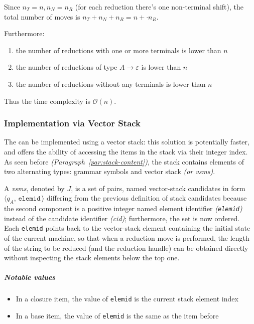 \documentclass[english]{article}
\begin{document}
Since \(n_T = n, n_N=n_R\) (for each reduction there's one non-terminal shift), the total number of moves is \(n_T + n_N + n_R = n +  \cdot n_R\).

Furthermore:
\begin{enumerate}
  \item the number of reductions with one or more terminals is lower than \(n\)
  \item the number of reductions of type \(A \rightarrow \varepsilon\) is lower than \(n\)
  \item the number of reductions without any terminals is lower than \(n\)
\end{enumerate}

Thus the time complexity is \(\mathcal{O}(n)\).

\subsubsection{Implementation via Vector Stack}

The \PDA can be implemented using a vector stack: this solution is potentially faster, and offers the ability of accessing the items in the stack via their integer index.
As seen before \textit{(Paragraph~\ref{par:stack-content})}, the stack contains elements of two alternating types: grammar symbols and vector stack \mstates \textit{(or vsms)}.

A \textit{vsms}, denoted by \(J\), is a set of pairs, named vector-stack candidates in form \(\langle q_A, \, \texttt{elemid} \, \rangle\) differing from the previous definition of stack candidates because the second component is a positive integer named element identifier \textit{(\texttt{elemid})} instead of the candidate identifier \textit{(cid)};
furthermore, the set is now ordered.
Each \texttt{elemid} points back to the vector-stack element containing the initial state of the current machine, so that when a reduction move is performed, the length of the string to be reduced (and the reduction handle) can be obtained directly without inspecting the stack elements below the top one.

\subparagraph*{Notable values}

\begin{itemize}
  \item In a closure item, the value of \texttt{elemid} is the current stack element index
  \item In a base item, the value of \texttt{elemid} is the same as the item before
\end{itemize}
\end{document}
